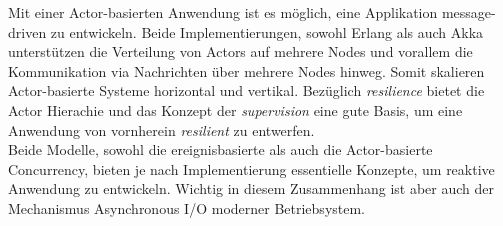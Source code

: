 Mit einer Actor-basierten Anwendung ist es möglich, eine Applikation message-driven zu entwickeln. Beide Implementierungen, sowohl Erlang als auch Akka unterstützen die Verteilung von Actors auf mehrere Nodes und vorallem die Kommunikation via Nachrichten über mehrere Nodes hinweg. Somit skalieren Actor-basierte Systeme horizontal und vertikal. Bezüglich \textit{resilience} bietet die Actor Hierachie und das Konzept der \textit{supervision} eine gute Basis, um eine Anwendung von vornherein \textit{resilient} zu entwerfen.\\

Beide Modelle, sowohl die ereignisbasierte als auch die Actor-basierte Concurrency, bieten je nach Implementierung essentielle Konzepte, um reaktive Anwendung zu entwickeln. Wichtig in diesem Zusammenhang ist aber auch der Mechanismus Asynchronous I/O moderner Betriebsystem.
